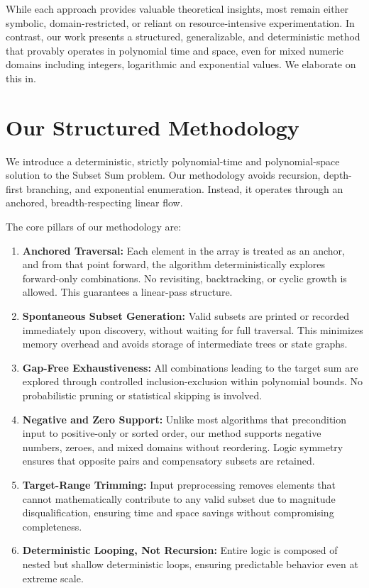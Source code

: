 \documentclass[11pt]{article}
\begin{document}
While each approach provides valuable theoretical insights, most remain either symbolic, domain-restricted, or reliant on resource-intensive experimentation. In contrast, our work presents a structured, generalizable, and deterministic method that provably operates in polynomial time and space, even for mixed numeric domains including integers, logarithmic and exponential values. We elaborate on this in.

\vspace{1em}

\section{Our Structured Methodology} \label{sec:methodology}

We introduce a deterministic, strictly polynomial-time and polynomial-space solution to the Subset Sum problem. Our methodology avoids recursion, depth-first branching, and exponential enumeration. Instead, it operates through an anchored, breadth-respecting linear flow.

The core pillars of our methodology are:

\begin{enumerate}
    \item \textbf{Anchored Traversal:} Each element in the array is treated as an anchor, and from that point forward, the algorithm deterministically explores forward-only combinations. No revisiting, backtracking, or cyclic growth is allowed. This guarantees a linear-pass structure.
    
    \item \textbf{Spontaneous Subset Generation:} Valid subsets are printed or recorded immediately upon discovery, without waiting for full traversal. This minimizes memory overhead and avoids storage of intermediate trees or state graphs.
    
    \item \textbf{Gap-Free Exhaustiveness:} All combinations leading to the target sum are explored through controlled inclusion-exclusion within polynomial bounds. No probabilistic pruning or statistical skipping is involved.
    
    \item \textbf{Negative and Zero Support:} Unlike most algorithms that precondition input to positive-only or sorted order, our method supports negative numbers, zeroes, and mixed domains without reordering. Logic symmetry ensures that opposite pairs and compensatory subsets are retained.
    
    \item \textbf{Target-Range Trimming:} Input preprocessing removes elements that cannot mathematically contribute to any valid subset due to magnitude disqualification, ensuring time and space savings without compromising completeness.
    
    \item \textbf{Deterministic Looping, Not Recursion:} Entire logic is composed of nested but shallow deterministic loops, ensuring predictable behavior even at extreme scale.
\end{enumerate}
\end{document}

